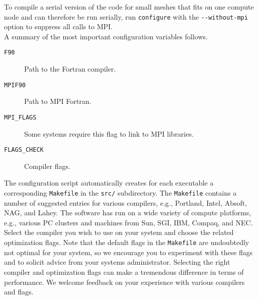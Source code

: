 To compile a serial version of the code for small meshes that fits
on one compute node and can therefore be run serially, run \texttt{configure}
with the \texttt{-{}-without-mpi} option to suppress all calls to
MPI.\\

A summary of the most important configuration variables follows.
\begin{description}
\item [{\texttt{F90}}] Path to the Fortran compiler.
\item [{\texttt{MPIF90}}] Path to MPI Fortran.
\item [{\texttt{MPI\_FLAGS}}] Some systems require this flag to link to
MPI libraries.
\item [{\texttt{FLAGS\_CHECK}}] Compiler flags.
\end{description}
The configuration script automatically creates for each executable
a corresponding \texttt{Makefile} in the \texttt{src/} subdirectory.
The \texttt{Makefile} contains a number of suggested entries for various
compilers, e.g., Portland, Intel, Absoft, NAG, and Lahey. The software
has run on a wide variety of compute platforms, e.g., various PC clusters
and machines from Sun, SGI, IBM, Compaq, and NEC. Select the compiler
you wish to use on your system and choose the related optimization
flags. Note that the default flags in the \texttt{Makefile} are undoubtedly
not optimal for your system, so we encourage you to experiment with
these flags and to solicit advice from your systems administrator.
Selecting the right compiler and optimization flags can make a tremendous
difference in terms of performance. We welcome feedback on your experience
with various compilers and flags.

